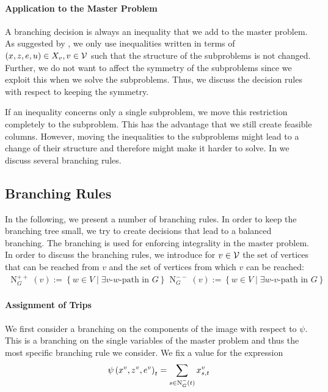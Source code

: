 \paragraph{Application to the Master Problem} \parfill

A branching decision is always an inequality that we add to the master problem. As suggested by \cite{Kaiser}, we only use inequalities written in terms of ${(x,z,e,u)\in X_v}, {v\in\mathcal{V}}$ such that the structure of the subproblems is not changed. Further, we do not want to affect the symmetry of the subproblems since we exploit this when we solve the subproblems. Thus, we discuss the decision rules with respect to keeping the symmetry.

If an inequality concerns only a single subproblem, we move this restriction completely to the subproblem. This has the advantage that we still create feasible columns. However, moving the inequalities to the subproblems might lead to a change of their structure and therefore might make it harder to solve. In  we discuss several branching rules.


\subsection{Branching Rules}
\label{sec:branching_rules}

In the following, we present a number of branching rules. In order to keep the branching tree small, we try to create decisions that lead to a balanced branching. The branching is used for enforcing integrality in the master problem. In order to discuss the branching rules, we introduce for $v\in\mathcal{V}$ the set of vertices that can be reached from $v$ and the set of vertices from which $v$ can be reached:
\begin{align*}
	\operatorname{N}_G^{++}(v) := \left\{w\in V\mid\exists v \text{-} w \text{-path in } G\right\} && \operatorname{N}_G^{--}(v) := \left\{w\in V\mid\exists w \text{-} v \text{-path in } G\right\}
\end{align*}

\paragraph{Assignment of Trips} \parfill

We first consider a branching on the components of the image with respect to $\psi$. This is a branching on the single variables of the master problem and thus the most specific branching rule we consider. We fix a value for the expression
\begin{align*}
	\psi\left(x^v,z^v,e^v\right)_t = \sum_{s\in\operatorname{N}_G^-(t)} x^v_{s,t}
\end{align*}

